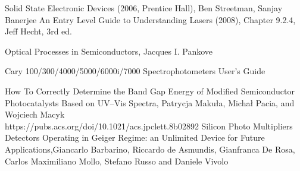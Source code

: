 \documentclass[10pt,a4paper]{article}
\begin{document}
\begin{thebibliography}{9}
 Solid State Electronic Devices (2006, Prentice Hall), Ben Streetman, Sanjay Banerjee
An Entry Level Guide to Understanding Lasers (2008), Chapter 9.2.4, Jeff Hecht, 3rd ed. 

Optical Processes in Semiconductors, Jacques I. Pankove

Cary 100/300/4000/5000/6000i/7000 Spectrophotometers User's Guide

How To Correctly Determine the Band Gap Energy of Modified Semiconductor Photocatalysts Based on UV–Vis Spectra, Patrycja Makuła, Michał Pacia, and Wojciech Macyk\\https://pubs.acs.org/doi/10.1021/acs.jpclett.8b02892
Silicon Photo Multipliers Detectors Operating in Geiger Regime: an Unlimited Device for Future Applications,Giancarlo Barbarino, Riccardo de Asmundis, Gianfranca De Rosa, Carlos Maximiliano Mollo, Stefano Russo and Daniele Vivolo
\end{thebibliography}    
\end{document}
